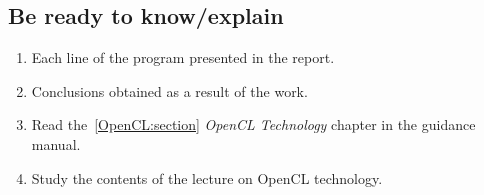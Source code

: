 { %
	\subsection{Be ready to know/explain}
	\begin{enumerate}
		\item Each line of the program presented in the report.
		\item Conclusions obtained as a result of the work.
		\item Read the~\ref{OpenCL:section} \textit{OpenCL Technology} chapter in the guidance manual.
		\item Study the contents of the lecture on OpenCL technology.
	\end{enumerate}
}